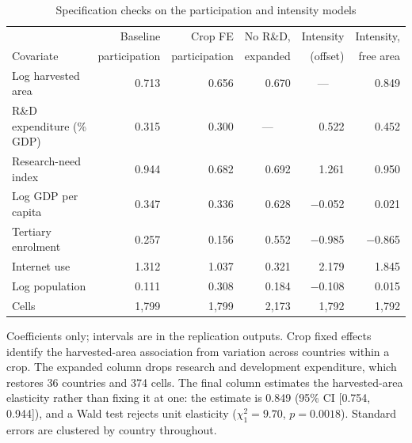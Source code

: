 \begin{table}[!t]
\centering
\caption{Specification checks on the participation and intensity models}
\label{tab:specchecks}
\begin{tabular*}{\textwidth}{@{\extracolsep\fill}l r r r r r@{}}
\toprule
& Baseline & Crop FE & No R\&D, & Intensity & Intensity, \\
Covariate & participation & participation & expanded & (offset) & free area \\
\midrule
Log harvested area & 0.713 & 0.656 & 0.670 & \multicolumn{1}{c}{---} & 0.849 \\
R\&D expenditure (\% GDP) & 0.315 & 0.300 & \multicolumn{1}{c}{---} & 0.522 & 0.452 \\
Research-need index & 0.944 & 0.682 & 0.692 & 1.261 & 0.950 \\
Log GDP per capita & 0.347 & 0.336 & 0.628 & $-$0.052 & 0.021 \\
Tertiary enrolment & 0.257 & 0.156 & 0.552 & $-$0.985 & $-$0.865 \\
Internet use & 1.312 & 1.037 & 0.321 & 2.179 & 1.845 \\
Log population & 0.111 & 0.308 & 0.184 & $-$0.108 & 0.015 \\
\midrule
Cells & 1,799 & 1,799 & 2,173 & 1,792 & 1,792 \\
\bottomrule
\end{tabular*}
\begin{tablenotes}
\item[] Coefficients only; intervals are in the replication outputs. Crop fixed effects identify the harvested-area association from variation across countries within a crop. The expanded column drops research and development expenditure, which restores 36 countries and 374 cells. The final column estimates the harvested-area elasticity rather than fixing it at one: the estimate is 0.849 (95\% CI [0.754, 0.944]), and a Wald test rejects unit elasticity ($\chi^2_1 = 9.70$, $p = 0.0018$). Standard errors are clustered by country throughout.
\end{tablenotes}
\end{table}
